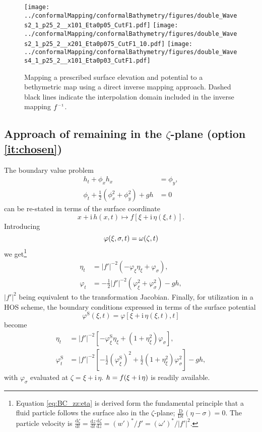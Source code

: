 \documentclass[internal]{sintefmemo}
\newcommand{\mr}{\mathrm}
\renewcommand{\S}{^\mr{S}}
\newcommand{\ii}{\mr{i}\,}
\renewcommand{\_}[1]{_\mr{#1}}
\let\Re\relax
\let\Im\relax
\DeclareMathOperator\Re{Re}
\DeclareMathOperator\Im{Im}
\newcommand{\w}{w}
\newcommand{\rbr}[1]{\left(#1\right)}
\newcommand{\sbr}[1]{\left[#1\right]}
\newcommand{\z}{z}
\newcommand{\x}{x}
\newcommand{\zz}{\zeta}
\newcommand{\xx}{\xi}
\newcommand{\yy}{\sigma}
\newcommand{\zmap}{f}
\newcommand{\zzmap}{\zmap^{\raisebox{.2ex}{$\scriptscriptstyle-1$}}}
\newcommand{\ww}{\omega}
\renewcommand{\w}{w}
\newcommand{\dd}[2]{\frac{\mr d #1}{\mr d #2}}
\begin{document}
\begin{figure}[h!ptb]%
\centering
{\texttt{[image: ../conformalMapping/conformalBathymetry/figures/double\_nWaves2\_h1\_0p25\_h2\_1\_nx101\_aEta0p05\_kCutF1.pdf]}}%
{\texttt{[image: ../conformalMapping/conformalBathymetry/figures/double\_nWaves2\_h1\_0p25\_h2\_1\_nx201\_aEta0p075\_kCutF1\_L10.pdf]}}
{\texttt{[image: ../conformalMapping/conformalBathymetry/figures/double\_nWaves4\_h1\_0p25\_h2\_1\_nx101\_aEta0p03\_kCutF1.pdf]}}
\caption{Mapping a prescribed surface elevation and potential to a bethymetric map using a direct inverse mapping approach. Dashed black lines indicate the interpolation domain included in the inverse mapping $\zzmap$.}%
\label{fig:res:double2}%
\end{figure}


\subsection{Approach of remaining in the $\zz$-plane (option \ref{it:chosen})}
\label{sec:zz-planeApproach}
The boundary value problem 
\begin{align*}
h_t + \phi_x h_x&=\phi_y,\\
\phi_t + \frac12\rbr{\phi_x^2+\phi_y^2}+gh&=0
\end{align*}
can be re-stated in terms of the surface coordinate
\[
\x+\ii h(\x,t) \mapsto f[\xx+\ii \eta(\xx,t)].
\]
Introducing
\[\varphi(\xx,\yy,t)=\Re\ww(\zz,t) \]
we get\footnote{
Equation \eqref{eq:BC_zz:eta} is derived form the fundamental principle that a fluid particle follows the surface also in the $\zz$-plane; $\frac{\mr D}{\mr D t}(\eta-\yy)=0$. The particle velocity is 
$\dd\zz t = \dd\z t \dd\zz\z =(\w')^*/f'=(\ww')^*\big/|f'|^2$.
}
\begin{subequations}
\begin{align}
\eta_t &= |\zmap'|^{-2}  \rbr{ -  \varphi_\xx\eta_\xx  +  \varphi_\yy}, \label{eq:BC_zz:eta} \\
\varphi_t &=   - \frac12 |\zmap'|^{-2} \rbr{\varphi_\xx^2+\varphi_\yy^2}  - g h,
\end{align}%
\label{eq:BC_zz}%
\end{subequations}%
$|\zmap'|^{2}$ being equivalent to the transformation Jacobian. 
Finally, for utilization in a HOS scheme, the boundary conditions expressed in terms of the surface potential 
\[
\varphi\S(\xx,t)=\varphi[\xx+\ii\eta(\xx,t),t]
\]
become
\begin{subequations}
\begin{align}
\eta_t &= |\zmap'|^{-2} \sbr{-   \varphi\S_\xx\eta_\xx + \rbr{1+\eta_\xx^2} \varphi_\yy},\\
\varphi\S_t  &= |\zmap'|^{-2}\sbr{ - \frac12  \rbr{\varphi\S_\xx}^2 + \frac12 \rbr{1+\eta_\xx^2} \varphi_\yy^2 }  - g h,
\end{align}%
\end{subequations}%
with  $\varphi_\yy$ evaluated at $\zz=\xx+\ii\eta$.
$h=\Im \zmap(\xx+\ii\eta)$ is readily available. 
\end{document}

